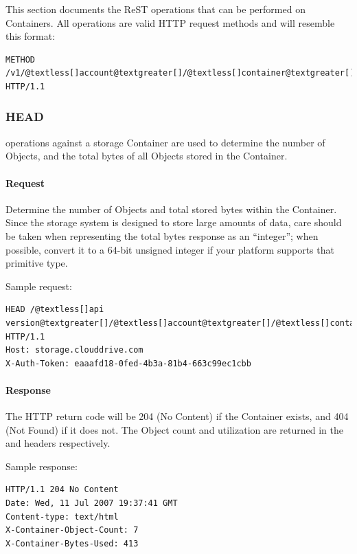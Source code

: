 \documentclass[letterpaper,10pt,english]{manual}
\begin{document}
This section documents the ReST operations that can be performed on
Containers. All operations are valid HTTP request methods and will
resemble this format:

\begin{Verbatim}[commandchars=@\[\]]
METHOD /v1/@textless[]account@textgreater[]/@textless[]container@textgreater[] HTTP/1.1
\end{Verbatim}


\subsubsection{HEAD}

 operations against a storage Container are used to determine the
number of Objects, and the total bytes of all Objects stored in the
Container.


\paragraph{Request}

Determine the number of Objects and total stored bytes within the
Container.  Since the storage system is designed to store large amounts
of data, care should be taken when representing the total bytes response
as an “integer”; when possible, convert it to a 64-bit unsigned integer
if your platform supports that primitive type.

Sample request:

\begin{Verbatim}[commandchars=@\[\]]
HEAD /@textless[]api version@textgreater[]/@textless[]account@textgreater[]/@textless[]container@textgreater[] HTTP/1.1
Host: storage.clouddrive.com
X-Auth-Token: eaaafd18-0fed-4b3a-81b4-663c99ec1cbb
\end{Verbatim}


\paragraph{Response}

The HTTP return code will be 204 (No Content) if the Container exists,
and 404 (Not Found) if it does not. The Object count and utilization are
returned in the  and 
headers respectively.

Sample response:

\begin{Verbatim}[commandchars=@\[\]]
HTTP/1.1 204 No Content
Date: Wed, 11 Jul 2007 19:37:41 GMT
Content-type: text/html
X-Container-Object-Count: 7
X-Container-Bytes-Used: 413
\end{Verbatim}
\end{document}
